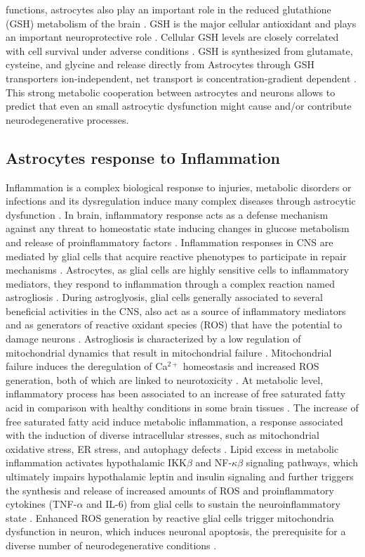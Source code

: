 functions, astrocytes also play an important role in the reduced glutathione (GSH) metabolism of the brain \cite{Raps1989}. GSH is the major cellular antioxidant and plays an important neuroprotective role \cite{Jha2016}. Cellular GSH levels are closely correlated with cell survival under adverse conditions \cite{Allaman2011}. GSH is synthesized from glutamate, cysteine, and glycine and release directly from Astrocytes through GSH transporters ion-independent, net transport is concentration-gradient dependent \cite{Wang2000}. This strong metabolic cooperation between astrocytes and neurons allows to predict that even an small astrocytic dysfunction might cause and/or contribute neurodegenerative processes.
\subsection*{Astrocytes response to Inflammation}
Inflammation is a complex biological response to injuries, metabolic disorders or infections and its dysregulation induce many complex diseases through astrocytic dysfunction \cite{Masel2010,Yan2013,Jha2016}. In brain, inflammatory response acts as a defense mechanism against any threat to homeostatic state inducing changes in glucose metabolism and release of proinflammatory factors \cite{Allaman2011}. Inflammation responses in CNS are mediated by glial cells that acquire reactive phenotypes to participate in repair mechanisms \cite{Takuma2004,Fitch2008,Jha2016}. Astrocytes, as glial cells are highly sensitive cells to inflammatory mediators, they respond to inflammation through a complex reaction named astrogliosis \cite{Dowell2009a}. During astroglyosis,  glial cells generally associated to several beneficial activities in the CNS, also act as a source of inflammatory mediators and as generators of reactive oxidant species (ROS) that have the potential to damage neurons \cite{Molofsk2012}. Astrogliosis is characterized by a low regulation of mitochondrial dynamics that result in mitochondrial failure \cite{Sidoryk-Wegrzynowicz2013}.  Mitochondrial failure induces the deregulation of Ca$^{2+}$ homeostasis and increased ROS generation, both of which are linked to neurotoxicity \cite{Lange2012}. At metabolic level, inflammatory process has been associated to an increase of free saturated fatty acid in comparison with healthy conditions in some brain tissues \cite{Gupta2012}. The increase of free saturated fatty acid induce metabolic inflammation, a response associated with the induction of diverse intracellular stresses, such as mitochondrial oxidative stress, ER stress, and autophagy defects \cite{Jha2016}. Lipid excess in metabolic inflammation activates hypothalamic IKK$\beta$ and NF-$\kappa\beta$ signaling pathways, which ultimately impairs hypothalamic leptin and insulin signaling and further triggers the synthesis and release of increased amounts of ROS and proinflammatory cytokines (TNF-$\alpha$ and IL-6) from glial cells to sustain the neuroinflammatory state \cite{Purkayastha2015}. Enhanced ROS generation by reactive glial cells trigger mitochondria dysfunction in neuron, which induces neuronal apoptosis, the prerequisite for a diverse number of neurodegenerative conditions \cite{K.2006}.
